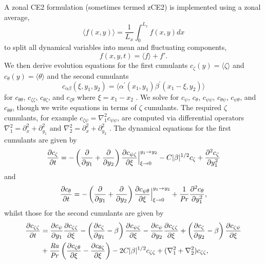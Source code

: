 \documentclass{jfm}
\newcommand{\cz}{c_{\zeta}}
\newcommand{\cs}{c_{\psi}}
\newcommand{\ct}{c_{\theta}}
\newcommand{\css}{c_{\psi \psi}}
\newcommand{\csz}{c_{\psi \zeta}}
\newcommand{\czs}{c_{\zeta \psi}}
\newcommand{\czz}{c_{\zeta \zeta}}
\newcommand{\ctz}{c_{\theta \zeta}}
\newcommand{\czt}{c_{\zeta \theta}}
\newcommand{\ctt}{c_{\theta \theta}}
\newcommand{\cst}{c_{\psi \theta}}
\newcommand{\cts}{c_{\theta \psi}}
\newcommand{\Rayleigh}{\mbox{\textit{Ra}}}  %
\begin{document}
A zonal CE2 formulation (sometimes termed zCE2) is implemented using a zonal average, 
\begin{equation}
\langle f(x,y) \rangle = \frac{1}{L_x} \int_0^{L_x} f(x,y) dx
\end{equation}
to split all dynamical variables into mean and fluctuating components,
\begin{equation}
    f(x,y,t) = \langle f \rangle + f'.
\end{equation}
We then derive evolution equations for the first cumulants $\cz(y) = \langle \zeta \rangle $ and $\ct(y) = \langle \theta \rangle$ and the second cumulants 
\begin{equation}
    c_{\alpha\beta}(\xi,y_1,y_2) = \langle \alpha^\prime(x_1,y_1) \beta^\prime(x_1-\xi,y_2) \rangle
\end{equation}
for $\ctt$, $\czz$, $\ctz$, and $\czt$ where $\xi = x_1 - x_2$ . 
We solve for $\cs$, $\ct$, $\css$, $\cts$, $\cst$, and $\ctt$, though we write equations in terms of $\zeta$ cumulants.
The required $\zeta$ cumulants, for example $\czs = \nabla^2_1 \css$, are computed via differential operators $\nabla^2_1 = \partial_x^2 + \partial_{y_1}^2$ and $\nabla^2_2 = \partial_x^2 + \partial_{y_2}^2$ \citep[as in][]{2013PhRvL.110j4502T}.
The  dynamical equations for the first cumulants are given by
\begin{equation}
  \label{eq:cz}
  \pdv{\cz}{t} = - \left(\pdv{}{y_1} + \pdv{}{y_2}\right) \pdv{\csz}{\xi}\Big|_{\xi \to 0}^{y_1 \to y_2} - C |\beta|^{1/2} \cz + \pdv[2]{\cz}{y_1}
\end{equation}
and
\begin{equation}
  \label{eq:ct}
  \pdv{\ct}{t} = - \left(\pdv{}{y_1} + \pdv{}{y_2}\right) \pdv{\cst}{\xi} \Big|_{\xi \to 0}^{y_1 \to y_2} + \frac{1}{\Pran} \pdv[2]{\ct}{y_1},
\end{equation}
whilst those for the second cumulants are given by
\begin{equation}
  \label{eq:czz}
  \begin{split}
    \pdv{\czz}{t} &= \pdv{\cs}{y_1} \pdv{\czz}{\xi} - \left(\pdv{\cz}{y_1} - \beta\right) \pdv{\csz}{\xi} - \pdv{\cs}{y_2} \pdv{\czz}{\xi}  + \left(\pdv{\cz}{y_2} - \beta\right) \pdv{\czs}{\xi}\\
    &+ \frac{\Rayleigh}{\Pran} \left(\pdv{\czt}{\xi} -  \pdv{\ctz}{\xi}\right) - 2C |\beta|^{1/2} \czz + (\nabla_1^2 + \nabla_2^2) \czz,    
  \end{split}
\end{equation}
\end{document}
